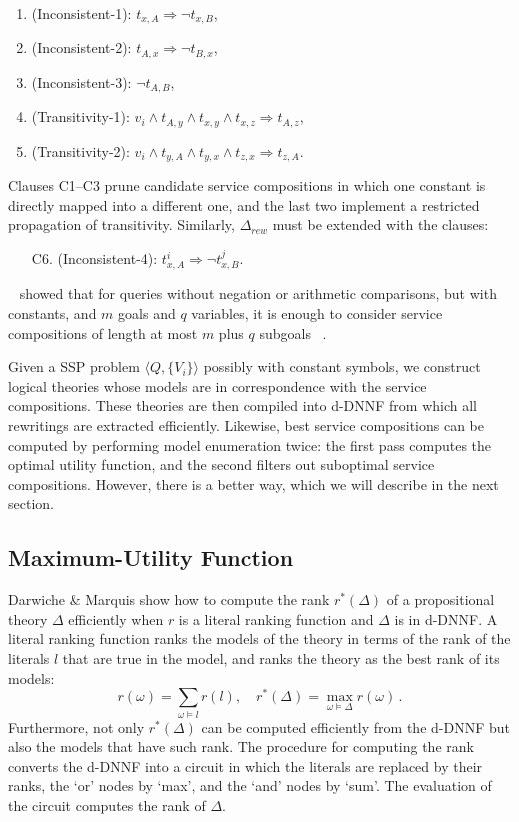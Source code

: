 \documentclass{article}
\newcommand{\denselist}{\topsep 0pt \itemsep -4pt}
\newcommand{\tup}[1]{\langle #1 \rangle}
\begin{document}
{\begin{enumerate}[C1.]\denselist
\item (Inconsistent-1): $t_{x,A} \Rightarrow \neg t_{x,B}$,
\item (Inconsistent-2): $t_{A,x} \Rightarrow \neg t_{B,x}$,
\item (Inconsistent-3): $\neg t_{A,B}$,
\item (Transitivity-1): $v_i\land t_{A,y}\land t_{x,y}\land t_{x,z}\Rightarrow t_{A,z}$,
\item (Transitivity-2): $v_i\land t_{y,A}\land t_{y,x}\land t_{z,x}\Rightarrow t_{z,A}$.
\end{enumerate}
Clauses C1--C3 prune candidate service compositions in which one constant
is directly mapped into a different one, and the last two implement
a restricted propagation of transitivity.
Similarly, $\Delta_{rew}$ must be extended with the clauses:
\begin{enumerate}[C1.]\denselist
\item[C6.] (Inconsistent-4): $t^i_{x,A} \Rightarrow \neg t^j_{x,B}$.
\end{enumerate}
~\cite{RajaramanSU95} showed that for queries without negation or arithmetic comparisons,  but with constants, and $m$ goals and $q$ variables, it is enough
to consider service compositions of length at most  $m$ plus  $q$ subgoals ~\cite{Ullman00}.

Given a SSP problem $\tup{Q,\{V_i\}}$ possibly with constant 
symbols, we construct logical theories whose models are in
correspondence with the service compositions. These theories are then
compiled into d-DNNF from which all rewritings are extracted
efficiently.
Likewise, best service compositions can be computed by performing model
enumeration twice: the first pass computes the optimal utility function,
and the second filters out suboptimal service compositions.
However, there is a better way, which we will describe in the next section.

\subsection{Maximum-Utility Function}

Darwiche \& Marquis \cite{darwiche:weighted} show how to compute the
rank $r^*(\Delta)$ of a propositional theory $\Delta$
efficiently when $r$ is a literal ranking function and
$\Delta$ is in d-DNNF. A literal ranking function ranks
the models of the theory in terms of the rank of the
literals $l$ that are true in the model, and ranks the
theory as the best rank of its models:
\[ r(\omega) = \sum_{\omega\vDash l} r(l),\quad r^*(\Delta) = \max_{\omega\vDash\Delta} r(\omega)\,. \]
Furthermore, not only $r^*(\Delta)$ can be computed
efficiently from the d-DNNF but also the models that
have such rank.
The procedure for computing the rank converts the d-DNNF
into a circuit in which the literals are replaced by their
ranks, the `or' nodes by `max', and the `and' nodes by `sum'.
The evaluation of the circuit computes the rank of $\Delta$.

}
\end{document}
